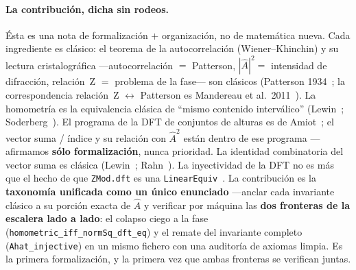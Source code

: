 \documentclass[11pt]{article}
\newcommand{\lean}[1]{\texttt{#1}}
\newcommand{\Ahat}{\hat{A}}
\begin{document}
\paragraph{La contribución, dicha sin rodeos.} Ésta es una nota de formalización $+$ organización, no de
matemática nueva. Cada ingrediente es clásico: el teorema de la autocorrelación (Wiener--Khinchin) y su
lectura cristalográfica ---autocorrelación $=$ Patterson, $|\Ahat|^2=$ intensidad de difracción,
relación~Z $=$ problema de la fase--- son clásicos (Patterson 1934~\cite{Patterson}; la correspondencia
relación~Z $\leftrightarrow$ Patterson es Mandereau et al.\ 2011~\cite{MAAA}). La
homometría es la equivalencia clásica de ``mismo contenido interválico'' (Lewin~\cite{Lewin}; Soderberg~\cite{Soderberg}).
El programa de la DFT de conjuntos de alturas es de Amiot~\cite{Amiot}; el vector suma / índice y su
relación con $\Ahat^2$ están dentro de ese programa ---afirmamos \textbf{sólo formalización}, nunca
prioridad. La identidad combinatoria del vector suma es clásica (Lewin~\cite{Lewin}; Rahn~\cite{Rahn}). La
inyectividad de la DFT no es más que el hecho de que \lean{ZMod.dft} es una \lean{LinearEquiv}~\cite{Loeffler}.
La contribución es la \textbf{taxonomía unificada como un único enunciado} ---anclar cada invariante
clásico a su porción exacta de $\Ahat$ y verificar por máquina las \textbf{dos fronteras de la escalera lado
a lado}: el colapso ciego a la fase (\lean{homometric\_iff\_normSq\_dft\_eq}) y el remate del invariante
completo (\lean{Ahat\_injective}) en un mismo fichero con una auditoría de axiomas limpia. Es la primera
formalización, y la primera vez que ambas fronteras se verifican juntas.
\end{document}

